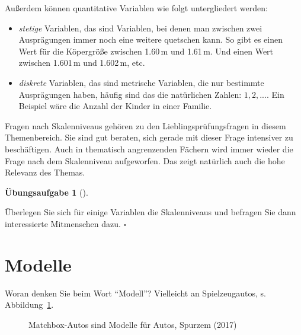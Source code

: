 \documentclass[
  letterpaper,
  twoside,
  open=any]{scrbook}
\providecommand{\tightlist}{%
  \setlength{\itemsep}{0pt}\setlength{\parskip}{0pt}}\usepackage{longtable,booktabs,array}
\theoremstyle{definition}
\newtheorem{exercise}{Übungsaufgabe}[chapter]
\theoremstyle{definition}
\theoremstyle{definition}
\theoremstyle{remark}
\begin{document}
Außerdem können quantitative Variablen wie folgt untergliedert werden:

\begin{itemize}
\tightlist
\item
  \emph{stetige} Variablen, das sind Variablen, bei denen man zwischen
  zwei Ausprägungen immer noch eine weitere quetschen kann. So gibt es
  einen Wert für die Köpergröße zwischen 1.60\,m und 1.61\,m. Und einen
  Wert zwischen 1.601\,m und 1.602\,m, etc.
\item
  \emph{diskrete} Variablen, das sind metrische Variablen, die nur
  bestimmte Ausprägungen haben, häufig sind das die natürlichen Zahlen:
  \(1,2,...\). Ein Beispiel wäre die Anzahl der Kinder in einer Familie.
\end{itemize}

Fragen nach Skalenniveaus gehören zu den Lieblingsprüfungsfragen in
diesem Themenbereich. Sie sind gut beraten, sich gerade mit dieser Frage
intensiver zu beschäftigen. Auch in thematisch angrenzenden Fächern wird
immer wieder die Frage nach dem Skalenniveau aufgeworfen. Das zeigt
natürlich auch die hohe Relevanz des Themas.

\begin{exercise}[]\protect\hypertarget{exr-skalenniveaus}{}\label{exr-skalenniveaus}

Überlegen Sie sich für einige Variablen die Skalenniveaus und befragen
Sie dann interessierte Mitmenschen dazu. \(\square\)

\end{exercise}

\section{Modelle}\label{modelle}

Woran denken Sie beim Wort \enquote{Modell}? Vielleicht an
Spielzeugautos, s. Abbildung~\ref{fig-matchbox}.

\begin{figure}


\caption{\label{fig-matchbox}Matchbox-Autos sind Modelle für Autos,
Spurzem (2017)}

\end{figure}%
\end{document}

